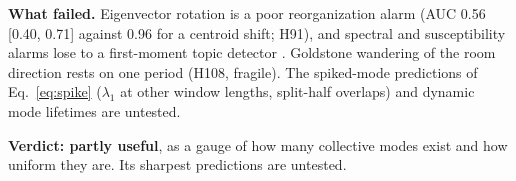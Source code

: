 \textbf{What failed.} Eigenvector rotation is a poor reorganization alarm (AUC 0.56 [0.40, 0.71] against 0.96 for a centroid shift; H91), and spectral and susceptibility alarms lose to a first-moment topic detector . Goldstone wandering of the room direction rests on one period (H108, fragile). The spiked-mode predictions of Eq.~\eqref{eq:spike} ($\lambda_1$ at other window lengths, split-half overlaps) and dynamic mode lifetimes are untested.

\textbf{Verdict: partly useful}, as a gauge of how many collective modes exist and how uniform they are. Its sharpest predictions are untested.

